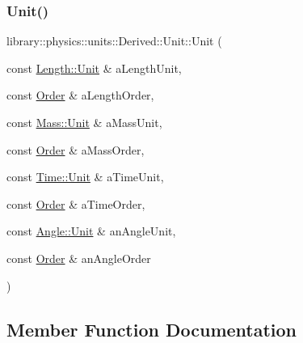 \subsubsection{\texorpdfstring{Unit()}{Unit()}}
{\footnotesize\ttfamily library\+::physics\+::units\+::\+Derived\+::\+Unit\+::\+Unit (\begin{DoxyParamCaption}\item[{const \hyperlink{classlibrary_1_1physics_1_1units_1_1_length_a3b8b39cd245cf6b19dc34459baeccb18}{Length\+::\+Unit} \&}]{a\+Length\+Unit,  }\item[{const \hyperlink{classlibrary_1_1physics_1_1units_1_1_derived_1_1_order}{Order} \&}]{a\+Length\+Order,  }\item[{const \hyperlink{classlibrary_1_1physics_1_1units_1_1_mass_a95f1e0434bc16794926b8e273bc2a54b}{Mass\+::\+Unit} \&}]{a\+Mass\+Unit,  }\item[{const \hyperlink{classlibrary_1_1physics_1_1units_1_1_derived_1_1_order}{Order} \&}]{a\+Mass\+Order,  }\item[{const \hyperlink{classlibrary_1_1physics_1_1units_1_1_time_ab876a6a05c9a2f28905f2753bfd64109}{Time\+::\+Unit} \&}]{a\+Time\+Unit,  }\item[{const \hyperlink{classlibrary_1_1physics_1_1units_1_1_derived_1_1_order}{Order} \&}]{a\+Time\+Order,  }\item[{const \hyperlink{classlibrary_1_1physics_1_1units_1_1_angle_a3c329d415a61783b16ce481874cc5956}{Angle\+::\+Unit} \&}]{an\+Angle\+Unit,  }\item[{const \hyperlink{classlibrary_1_1physics_1_1units_1_1_derived_1_1_order}{Order} \&}]{an\+Angle\+Order }\end{DoxyParamCaption})}



\subsection{Member Function Documentation}
\mbox{\label{classlibrary_1_1physics_1_1units_1_1_derived_1_1_unit_a0371d4157e5b4995c54989bb471f4a12}} 
